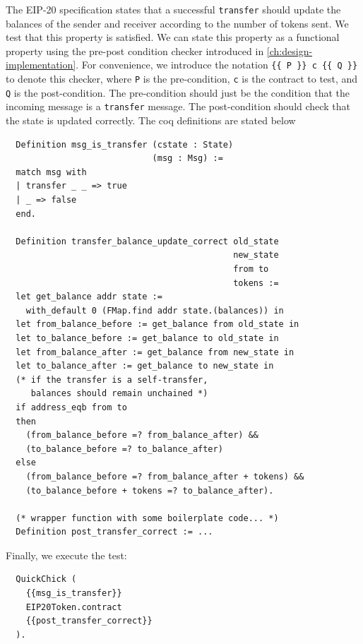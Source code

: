 \documentclass[twoside,11pt,openright]{report}
\newenvironment{code}{\captionsetup{type=figure, singlelinecheck=off, justification=raggedleft}}{}
\newcommand{\coq}[1]{\texttt{#1}}
\begin{document}
The EIP-20 specification states that a successful \coq{transfer} should update the balances of the sender and receiver according to the number of tokens sent. We test that this property is satisfied. We can state this property as a functional property using the pre-post condition checker introduced in \autoref{ch:design-implementation}. For convenience, we introduce the notation \coq{\{\{ P \}\} c \{\{ Q \}\}} to denote this checker, where \coq{P} is the pre-condition, \coq{c} is the contract to test, and \coq{Q} is the post-condition. The pre-condition should just be the condition that the incoming message is a \coq{transfer} message. The post-condition should check that the state is updated correctly. The coq definitions are stated below
\begin{code}
\label{def:msg-is-transfer-transfer-balance-update-correct}
\begin{verbatim}
  Definition msg_is_transfer (cstate : State) 
                             (msg : Msg) :=
  match msg with
  | transfer _ _ => true
  | _ => false
  end.

  Definition transfer_balance_update_correct old_state 
                                             new_state 
                                             from to 
                                             tokens :=
  let get_balance addr state := 
    with_default 0 (FMap.find addr state.(balances)) in 
  let from_balance_before := get_balance from old_state in
  let to_balance_before := get_balance to old_state in
  let from_balance_after := get_balance from new_state in
  let to_balance_after := get_balance to new_state in
  (* if the transfer is a self-transfer, 
     balances should remain unchained *)
  if address_eqb from to
  then 
    (from_balance_before =? from_balance_after) && 
    (to_balance_before =? to_balance_after)
  else
    (from_balance_before =? from_balance_after + tokens) && 
    (to_balance_before + tokens =? to_balance_after).

  (* wrapper function with some boilerplate code... *)
  Definition post_transfer_correct := ...
\end{verbatim}
\end{code}
Finally, we execute the test:
\begin{code}
\begin{verbatim}
  QuickChick (
    {{msg_is_transfer}}
    EIP20Token.contract
    {{post_transfer_correct}}
  ).  
\end{verbatim}
\end{code}
\end{document}
